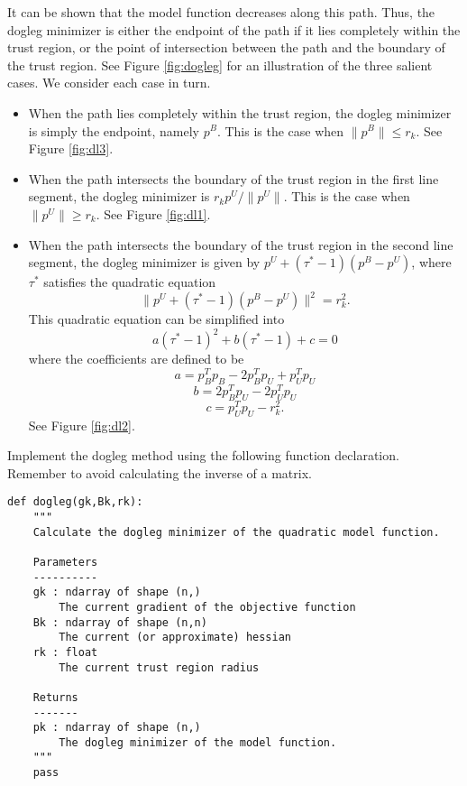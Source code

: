 It can be shown that the model function decreases along this path. Thus,
the dogleg minimizer is either the endpoint of the path if it lies completely within the trust region,
or the point of intersection between the path and the boundary of the trust region.
See Figure \ref{fig:dogleg} for an illustration of the three salient cases. We consider each case in turn.
\begin{itemize}
\item
When the path lies completely within the trust region, the dogleg minimizer is simply the endpoint, namely $p^B$.
This is the case when $\|p^B\| \leq r_k$. See Figure \ref{fig:dl3}.
\item
When the path intersects the boundary of the trust region in the first line segment, the dogleg minimizer is
$r_kp^U/\|p^U\|$.
This is the case when $\|p^U\| \geq r_k$. See Figure \ref{fig:dl1}.
\item
When the path intersects the boundary of the trust region in the second line segment, the dogleg minimizer is
given by $p^U + (\tau^*-1)(p^B-p^U)$, where $\tau^*$ satisfies the quadratic equation
\[
\|p^U + (\tau^*-1)(p^B-p^U)\|^2 = r_k^2.
\]
This quadratic equation can be simplified into 
\[
a(\tau^*-1)^2+b(\tau^*-1)+c = 0
\]
where the coefficients are defined to be
\[
a = p_B^Tp_B - 2p_B^Tp_U+p_U^Tp_U
\]
\[
b = 2p_B^Tp_U-2p_U^Tp_U
\]
\[
c = p_U^Tp_U-r_k^2.
\]
See Figure \ref{fig:dl2}.
\end{itemize}

\begin{problem}
Implement the dogleg method using the following function declaration.
Remember to avoid calculating the inverse of a matrix.
\begin{lstlisting}
def dogleg(gk,Bk,rk):
    """
    Calculate the dogleg minimizer of the quadratic model function.

    Parameters
    ----------
    gk : ndarray of shape (n,)
        The current gradient of the objective function
    Bk : ndarray of shape (n,n)
        The current (or approximate) hessian
    rk : float
        The current trust region radius

    Returns
    -------
    pk : ndarray of shape (n,)
        The dogleg minimizer of the model function.
    """
    pass
\end{lstlisting}

\label{prob:dogleg}
\end{problem}

